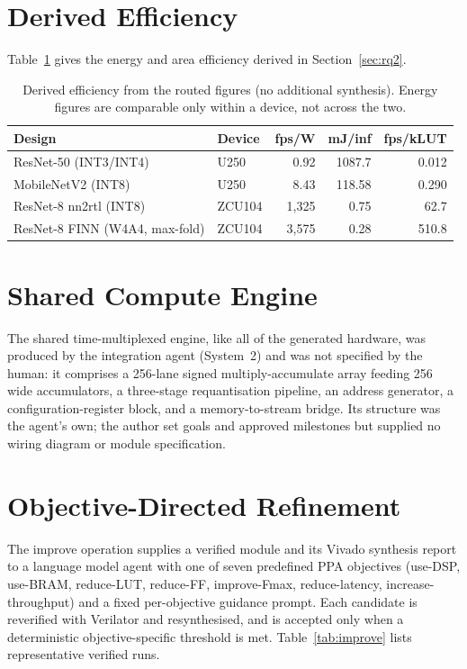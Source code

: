 \section{Derived Efficiency}\label{app:efficiency}

Table~\ref{tab:efficiency} gives the energy and area efficiency derived in Section~\ref{sec:rq2}.

\begin{table}[t]
\centering
\caption{Derived efficiency from the routed figures (no additional synthesis). Energy figures are comparable only within a device, not across the two.}
\label{tab:efficiency}
\footnotesize
\begin{tabular}{@{}llrrr@{}}
\toprule
Design & Device & fps/W & mJ/inf & fps/kLUT \\
\midrule
ResNet-50 (INT3/INT4) & U250 & 0.92 & 1087.7 & 0.012 \\
MobileNetV2 (INT8) & U250 & 8.43 & 118.58 & 0.290 \\
ResNet-8 nn2rtl (INT8) & ZCU104 & 1,325 & 0.75 & 62.7 \\
ResNet-8 FINN (W4A4, max-fold) & ZCU104 & 3,575 & 0.28 & 510.8 \\
\bottomrule
\end{tabular}
\end{table}


\section{Shared Compute Engine}\label{app:engine}

The shared time-multiplexed engine, like all of the generated hardware, was produced by the integration agent (System~2) and was not specified by the human: it comprises a 256-lane signed multiply-accumulate array feeding 256 wide accumulators, a three-stage requantisation pipeline, an address generator, a configuration-register block, and a memory-to-stream bridge. Its structure was the agent's own; the author set goals and approved milestones but supplied no wiring diagram or module specification.

\section{Objective-Directed Refinement}\label{app:improve}

The improve operation supplies a verified module and its Vivado synthesis report to a language model agent with one of seven predefined PPA objectives (use-DSP, use-BRAM, reduce-LUT, reduce-FF, improve-Fmax, reduce-latency, increase-throughput) and a fixed per-objective guidance prompt. Each candidate is reverified with Verilator and resynthesised, and is accepted only when a deterministic objective-specific threshold is met. Table~\ref{tab:improve} lists representative verified runs.

